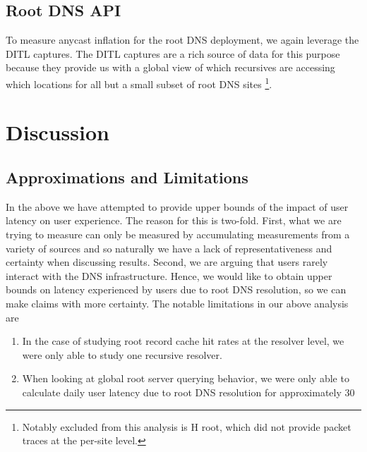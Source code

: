 \documentclass[sigconf,nonacm,10pt]{acmart}
\begin{document}
\subsection{Root DNS API}\label{root-dns-api}

\label{sec:api_root} To measure anycast inflation for the root DNS
deployment, we again leverage the DITL captures. The DITL captures are a
rich source of data for this purpose because they provide us with a
global view of which recursives are accessing which locations for all
but a small subset of root DNS sites
\footnote{Notably excluded from this analysis is H root, which did not provide packet traces at the per-site level.}.

\section{Discussion}\label{discussion}

\subsection{Approximations and
Limitations}\label{approximations-and-limitations}

\label{sec:discussion_approximations} In the above we have attempted to
provide upper bounds of the impact of user latency on user experience.
The reason for this is two-fold. First, what we are trying to measure
can only be measured by accumulating measurements from a variety of
sources and so naturally we have a lack of representativeness and
certainty when discussing results. Second, we are arguing that users
rarely interact with the DNS infrastructure. Hence, we would like to
obtain upper bounds on latency experienced by users due to root DNS
resolution, so we can make claims with more certainty. \break \break
The notable limitations in our above analysis are

\begin{enumerate}
        \item In the case of studying root record cache hit rates at the resolver level, we were only able to study one recursive resolver.
        \item When looking at global root server querying behavior, we were only able to calculate daily user latency due to root DNS resolution for approximately 30%
\end{enumerate}
\end{document}
